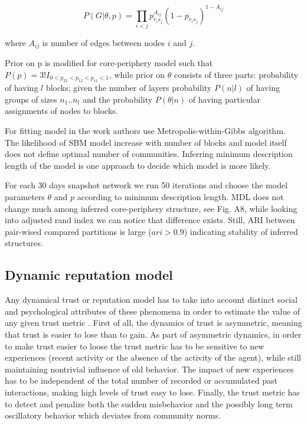 \begin{equation}
P(G | \theta , p) = \prod_{i<j} p_{r_is_j}^{A_{ij}}(1-p_{r_is_j})^{1-A_{ij}}  
\end{equation}

where $A_{ij}$ is number of edges between nodes $i$ and $j$. 

Prior on p is modified for core-periphery model such that $P(p) = 3!I_{0<p_{22}<p_{12}<p_{11}<1}$, while prior on $\theta $ consists of three parts: probability of having $l$ blocks; given the number of layers probability $P(n|l)$ of having groups of sizes ${n_1..n_l}$ and the probability $P(\theta|n)$ of having particular assignments of nodes to blocks. 

For fitting model in the work \cite{gallagher2020clarified} authors use Metropolis-within-Gibbs algorithm.
The likelihood of SBM model increase with number of blocks and model itself does not define optimal number of communities. Inferring minimum description length
of the model is one approach to decide which model is more likely.  

For each 30 days snapshot network we run 50 iterations and choose the model parameters $\theta$ and $p$ according to minimum description length. MDL does not change much among inferred core-periphery structure, see Fig. A8, while looking into adjusted rand index we can notice that difference exists. Still, ARI between pair-wised compared partitions is large ($ari >0.9$) indicating stability of inferred structures.

\subsection{Dynamic reputation model}

Any dynamical trust or reputation model has to take into account distinct social and psychological attributes of these phenomena in order to estimate the value of any given trust metric \cite{duma2005dynamic}. First of all, the dynamics of trust is asymmetric, meaning that trust is easier to lose than to gain. As part of asymmetric dynamics, in order to make trust easier to loose the trust metric has to be sensitive to new experiences (recent activity or the absence of the activity of the agent), while still maintaining nontrivial influence of old behavior. The impact of new experiences has to be independent of
the total number of recorded or accumulated past interactions, making high levels of trust easy to lose. 
Finally, the trust metric has to detect and penalize both the sudden misbehavior and the possibly long term oscillatory behavior which deviates from community norms.

